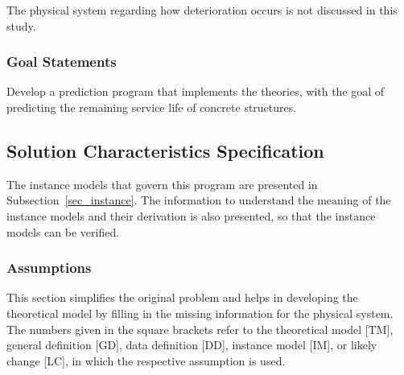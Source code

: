 \documentclass[12pt]{article}
\begin{document}
The physical system regarding how deterioration occurs is not discussed in this study.

\subsubsection{Goal Statements}

Develop a prediction program that implements the theories, with the goal of predicting the remaining service life of concrete structures.

\subsection{Solution Characteristics Specification}

The instance models that govern this program are presented in
Subsection~\ref{sec_instance}.  The information to understand the meaning of the
instance models and their derivation is also presented, so that the instance
models can be verified.

\subsubsection{Assumptions} \label{sec_assumpt}

This section simplifies the original problem and helps in developing the theoretical model by filling in the missing information for the physical system. The numbers given in the square brackets refer to the theoretical model [TM],
general definition [GD], data definition [DD], instance model [IM], or likely change [LC], in which the respective assumption is used.
\end{document}
